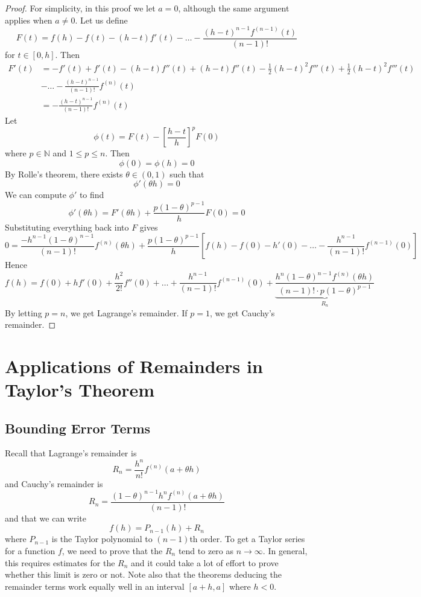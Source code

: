 \documentclass{article}
\begin{document}
\begin{proof}
    For simplicity, in this proof we let $a = 0$, although the same argument applies when $a \neq 0$. Let us define
    \[ F(t) = f(h) - f(t) - (h-t)f'(t) - \dots - \frac{(h-t)^{n-1}f^{(n-1)}(t)}{(n-1)!} \]
    for $t \in [0, h]$. Then
    \begin{align*}
        F'(t) & = -f'(t) + f'(t) - (h-t)f''(t) + (h-t)f''(t) - \frac{1}{2} (h-t)^2f'''(t) + \frac{1}{2} (h-t)^2f'''(t) \\
              & - \dots - \frac{(h-t)^{n-1}}{(n-1)!}f^{(n)}(t)                                                         \\
              & = - \frac{(h-t)^{n-1}}{(n-1)!}f^{(n)}(t)
    \end{align*}
    Let
    \[ \phi(t) = F(t) - \left[ \frac{h-t}{h} \right]^p F(0) \]
    where $p \in \mathbb N$ and $1 \leq p \leq n$. Then
    \[ \phi(0) = \phi(h) = 0 \]
    By Rolle's theorem, there exists $\theta \in (0, 1)$ such that
    \[ \phi'(\theta h) = 0 \]
    We can compute $\phi'$ to find
    \[ \phi'(\theta h) = F'(\theta h) + \frac{p(1-\theta)^{p-1}}{h} F(0) = 0 \]
    Substituting everything back into $F$ gives
    \[ 0 = \frac{-h^{n-1}(1-\theta)^{n-1}}{(n-1)!}f^{(n)}(\theta h) + \frac{p(1-\theta)^{p-1}}{h}\left[ f(h) - f(0) - h'(0) - \dots - \frac{h^{n-1}}{(n-1)!}f^{(n-1)}(0) \right] \]
    Hence
    \[ f(h) = f(0) + hf'(0) + \frac{h^2}{2!} f''(0) + \dots + \frac{h^{n-1}}{(n-1)!}f^{(n-1)}(0) + \underbrace{\frac{h^n(1 - \theta)^{n-1}f^{(n)}(\theta h)}{(n-1)!\cdot p(1-\theta)^{p-1}}}_{R_n} \]
    By letting $p = n$, we get Lagrange's remainder. If $p=1$, we get Cauchy's remainder.
\end{proof}

\section{Applications of Remainders in Taylor's Theorem}
\subsection{Bounding Error Terms}
Recall that Lagrange's remainder is
\[ R_n = \frac{h^n}{n!}f^{(n)}(a + \theta h) \]
and Cauchy's remainder is
\[ R_n = \frac{(1 - \theta)^{n-1}h^nf^{(n)}(a + \theta h)}{(n-1)!} \]
and that we can write
\[ f(h) = P_{n-1}(h) + R_n \]
where $P_{n-1}$ is the Taylor polynomial to $(n-1)$th order. To get a Taylor series for a function $f$, we need to prove that the $R_n$ tend to zero as $n \to \infty$. In general, this requires estimates for the $R_n$ and it could take a lot of effort to prove whether this limit is zero or not. Note also that the theorems deducing the remainder terms work equally well in an interval $[a+h, a]$ where $h < 0$.
\end{document}
